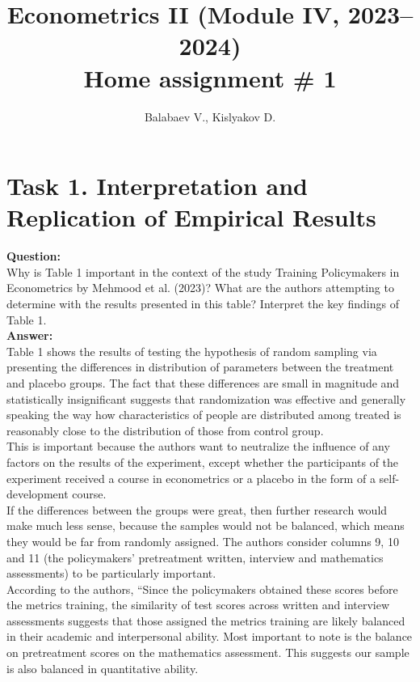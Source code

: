 \documentclass[12pt, a4paper]{article}
\title{Econometrics II (Module IV, 2023--2024) \\ Home assignment \# 1}
\author{Balabaev V., Kislyakov D.}
\begin{document}
	\maketitle

	\section*{Task 1. Interpretation and Replication of Empirical Results}
	\textbf{Question:}\\
	Why is Table 1 important in the context of the study Training Policymakers in Econometrics by Mehmood et al. (2023)? What are the authors attempting to determine with the results presented in this table? Interpret the key findings of Table 1.\\
	\textbf{Answer:}\\
	Table 1 shows the results of testing the hypothesis of random sampling via presenting the differences in distribution of parameters between the treatment and placebo groups. The fact that these differences are small in magnitude and statistically insignificant suggests that randomization was effective and generally speaking the way how characteristics of people are distributed among treated is reasonably close to the distribution of those from control group. \\
	This is important because the authors want to neutralize the influence of any factors on the results of the experiment, except whether the participants of the experiment received a course in econometrics or a placebo in the form of a self-development course. \\
	If the differences between the groups were great, then further research would make much less sense, because the samples would not be balanced, which means they would be far from randomly assigned. The authors consider columns 9, 10 and 11 (the policymakers' pretreatment written, interview and mathematics assessments) to be particularly important. \\
	According to the authors, ``Since the policymakers obtained these  scores before the metrics training, the similarity of test scores across written and interview assessments suggests that those assigned the metrics training are likely balanced in their academic and interpersonal ability. Most important to note is the balance on pretreatment scores on the mathematics assessment. This suggests our sample is also balanced in quantitative ability.\\
\end{document}
